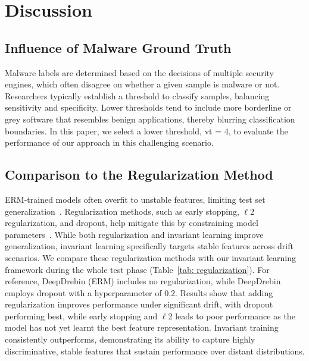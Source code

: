 \section{Discussion}
\subsection{Influence of Malware Ground Truth}
Malware labels are determined based on the decisions of multiple security engines, which often disagree on whether a given sample is malware or not. Researchers typically establish a threshold to classify samples, balancing sensitivity and specificity. Lower thresholds tend to include more borderline or grey software that resembles benign applications, thereby blurring classification boundaries. In this paper, we select a lower threshold, vt = 4, to evaluate the performance of our approach in this challenging scenario.



% 


\subsection{Comparison to the Regularization Method}
ERM-trained models often overfit to unstable features, limiting test set generalization~\cite{regularization}. Regularization methods, such as early stopping, $\ell$2 regularization, and dropout, help mitigate this by constraining model parameters~\cite{regularization_understanding}. While both regularization and invariant learning improve generalization, invariant learning specifically targets stable features across drift scenarios. We compare these regularization methods with our invariant learning framework during the whole test phase (Table~\ref{tab: regularization}). For reference, DeepDrebin (ERM) includes no regularization, while DeepDrebin~\cite{Grossedeepdrebin} employs dropout with a hyperparameter of 0.2. Results show that adding regularization improves performance under significant drift, with dropout performing best, while early stopping and $\ell$2 leads to poor performance as the model has not yet learnt the best feature representation. Invariant training consistently outperforms, demonstrating its ability to capture highly discriminative, stable features that sustain performance over distant distributions.

